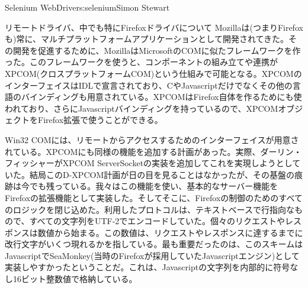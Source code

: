 \begin{aosachapter}{Selenium WebDriver}{s:selenium}{Simon Stewart}
\begin{aosasect1}{リモートドライバ、中でも特にFirefoxドライバについて}
Mozillaは(つまりFirefoxも)常に、マルチプラットフォームアプリケーションとして開発されてきた。その開発を促進するために、MozillaはMicrosoftのCOMに似たフレームワークを作った。このフレームワークを使うと、コンポーネントの組み立てや連携がXPCOM(クロスプラットフォームCOM)という仕組みで可能となる。XPCOMのインターフェイスはIDLで宣言されており、CやJavascriptだけでなくその他の言語のバインディングも用意されている。XPCOMはFirefox自体を作るためにも使われており、さらにJavascriptバインディングを持っているので、XPCOMオブジェクトをFirefox拡張で使うことができる。

Win32 COMには、リモートからアクセスするためのインターフェイスが用意されている。XPCOMにも同様の機能を追加する計画があった。実際、ダーリン・フィッシャーがXPCOM ServerSocketの実装を追加してこれを実現しようとしていた。結局このD-XPCOM計画が日の目を見ることはなかったが、その基盤の痕跡は今でも残っている。我々はこの機能を使い、基本的なサーバー機能をFirefoxの拡張機能として実装した。そしてそこに、Firefoxの制御のためのすべてのロジックを閉じ込めた。利用したプロトコルは、テキストベースで行指向なもので、すべての文字列をUTF-2でエンコードしていた。個々のリクエストやレスポンスは数値から始まる。この数値は、リクエストやレスポンスに達するまでに改行文字がいくつ現れるかを指している。最も重要だったのは、このスキームはJavascriptでSeaMonkey(当時のFirefoxが採用していたJavascriptエンジン)として実装しやすかったということだ。これは、Javascriptの文字列を内部的に符号なし16ビット整数値で格納している。


\end{aosasect1}
\end{aosachapter}
